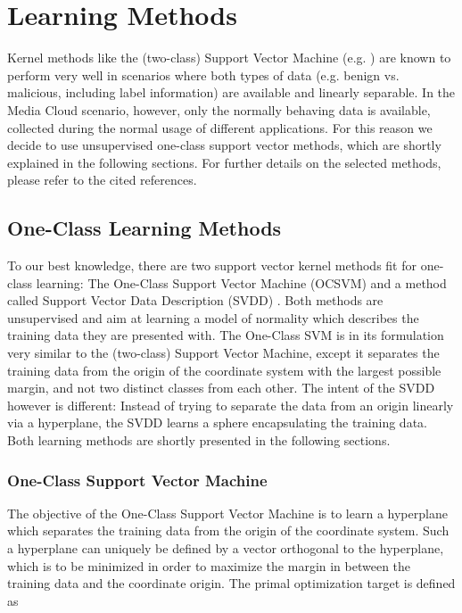 \documentclass{llncs}
\begin{document}
\section{Learning Methods}
\label{sec:learningmethods}
Kernel methods like the (two-class) Support Vector Machine (e.g. \cite{cortes1995support,ShaChr04}) are known to perform very well in scenarios where both types of data (e.g. benign vs. malicious, including label information) are available and linearly separable. In the Media Cloud scenario, however, only the normally behaving data is available, collected during the normal usage of different applications. For this reason we decide to use unsupervised one-class support vector methods, which are shortly explained in the following sections. For further details on the selected methods, please refer to the cited references.

\subsection{One-Class Learning Methods}
\label{sec:oneclasslearningmethods}
To our best knowledge, there are two support vector kernel methods fit for one-class learning: The One-Class Support Vector Machine (OCSVM) \cite{scholkopf1999support} and a method called Support Vector Data Description (SVDD) \cite{tax2004support,changrevisit}. Both methods are unsupervised and aim at learning a model of normality which describes the training data they are presented with. The One-Class SVM is in its formulation very similar to the (two-class) Support Vector Machine, except it separates the training data from the origin of the coordinate system with the largest possible margin, and not two distinct classes from each other. The intent of the SVDD however is different: Instead of trying to separate the data from an origin linearly via a hyperplane, the SVDD learns a sphere encapsulating the training data. Both learning methods are shortly presented in the following sections.


\subsubsection{One-Class Support Vector Machine}



The objective of the One-Class Support Vector Machine is to learn a hyperplane which separates the training data from the origin of the coordinate system. Such a hyperplane can uniquely be defined by a vector  orthogonal to the hyperplane, which is to be minimized in order to maximize the margin in between the training data  and the coordinate origin. 
The primal optimization target is defined as
\end{document}
